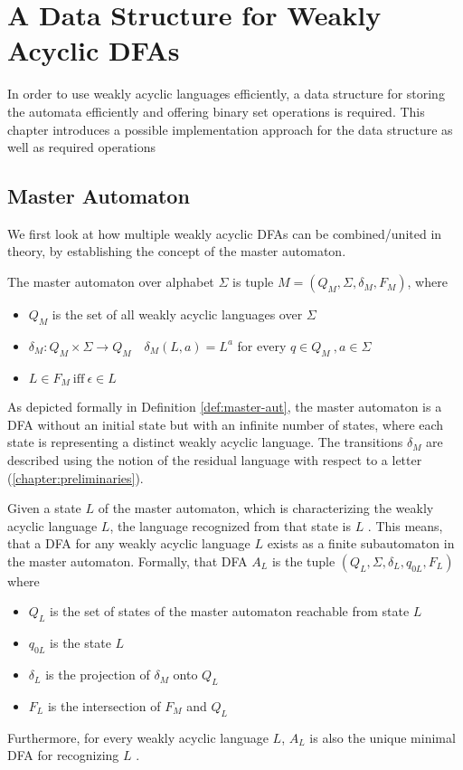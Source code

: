 \chapter{A Data Structure for Weakly Acyclic DFAs}\label{chapter:datastructure}

In order to use weakly acyclic languages efficiently, a data structure for storing the automata efficiently and offering binary set operations is required. This chapter introduces a possible implementation approach for the data structure as well as required operations

\section{Master Automaton}\label{sec:master-aut}
We first look at how multiple weakly acyclic DFAs can be combined/united in theory, by establishing the concept of the master automaton. 
\begin{definition}\label{def:master-aut}
The master automaton over alphabet $\Sigma$ is tuple $M = (Q_{M},\Sigma,\delta_{M},F_{M})$, where 
\begin{itemize}[--,noitemsep]
\item $Q_{M}$ is the set of all weakly acyclic languages over $\Sigma$
\item $\delta_{M}: Q_{M} \times \Sigma \rightarrow Q_{M} \quad \delta_{M}(L,a) = L^{a}$ for every $q \in Q_{M} \ , a \in \Sigma$
\item $L \in F_{M} \ \text{iff} \ \epsilon \in L$
\end{itemize}
\end{definition}
As depicted formally in Definition \autoref{def:master-aut}, the master automaton is a DFA without an initial state but with an infinite number of states, where each state is representing a distinct weakly acyclic language. The transitions $\delta_{M}$ are described using the notion of the residual language with respect to a letter (\autoref{chapter:preliminaries}).

\par

Given a state $L$ of the master automaton, which is characterizing the weakly acyclic language $L$, the language recognized from that state is $L$ \cite[Proposition~8]{blondin_24}. This means, that a DFA for any weakly acyclic language $L$ exists as a finite subautomaton in the master automaton. 
\newline
Formally, that DFA $A_{L}$ is the tuple $(Q_{L},\Sigma,\delta_{L},q_{0L},F_{L})$ where 
\begin{itemize}[--,noitemsep]
\item $Q_{L}$ is the set of states of the master automaton reachable from state $L$
\item $q_{0L}$ is the state $L$
\item $\delta_{L}$ is the projection of $\delta_{M}$ onto $Q_{L}$
\item $F_{L}$ is the intersection of $F_{M}$ and $Q_{L}$
\end{itemize}
Furthermore, for every weakly acyclic language $L$, $A_{L}$ is also the unique minimal DFA for recognizing $L$ \cite[Proposition~9]{blondin_24}. 


